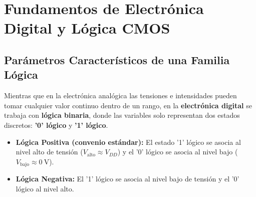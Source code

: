 \chapter{Fundamentos de Electrónica Digital y Lógica CMOS}
\label{cap:tema5}


\section{Parámetros Característicos de una Familia Lógica}

Mientras que en la electrónica analógica las tensiones e intensidades pueden tomar cualquier valor continuo dentro de un rango, en la \textbf{electrónica digital} se trabaja con \textbf{lógica binaria}, donde las variables solo representan dos estados discretos: \textbf{'0' lógico} y \textbf{'1' lógico}.
\begin{itemize}[leftmargin=*]
    \item \textbf{Lógica Positiva (convenio estándar):} El estado '1' lógico se asocia al nivel alto de tensión ($V_{\text{alto}} \approx V_{DD}$) y el '0' lógico se asocia al nivel bajo ($V_{\text{bajo}} \approx 0\ \si{\volt}$).
    \item \textbf{Lógica Negativa:} El '1' lógico se asocia al nivel bajo de tensión y el '0' lógico al nivel alto.
\end{itemize}

